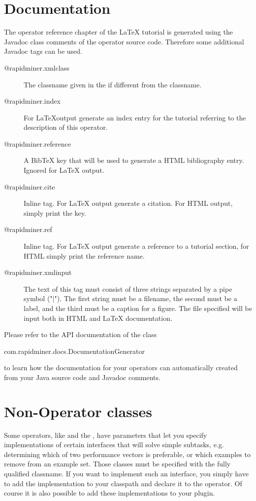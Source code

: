 \section{Documentation}
The operator reference chapter of the  \LaTeX{} \rapidminer tutorial is
generated using the Javadoc class comments of the operator source
code. Therefore some additional Javadoc tags can be used. 
\begin{description}
\item[@rapidminer.xmlclass] The classname given in the
   if different from the classname.
\item[@rapidminer.index] For \LaTeX output generate an index entry for the
  tutorial referring to the description of this operator.
\item[@rapidminer.reference] A BibTeX key that will be used to generate a
  HTML bibliography entry. Ignored for \LaTeX{} output.
\item[@rapidminer.cite] Inline tag. For \LaTeX{} output generate a citation. For HTML
  output, simply print the key.
\item[@rapidminer.ref] Inline tag. For \LaTeX{} output generate a reference
  to a tutorial section, for HTML simply print the reference name.
\item[@rapidminer.xmlinput] The text of this tag must consist of three
  strings separated by a pipe symbol ("$|$"). The first string must be
  a filename, the second must be a label, and the third must be a
  caption for a figure. The file specified will be input both in HTML
  and \LaTeX{} documentation.
\end{description}
Please refer to the API documentation of the class
\begin{center}
com.rapidminer.docs.DocumentationGenerator
\end{center}
to learn how the documentation for your operators can automatically created
from your Java source code and Javadoc comments.
 


\section{Non-Operator classes}

Some operators, like  and the
, have parameters that let you specify
implementations of certain interfaces that will solve simple
subtasks, e.g. determining which of two performance vectors is
preferable, or which examples to remove from an example set. Those classes
must be specified with the fully qualified classname. If you want to implement
such an interface, you simply have to add the implementation to your classpath
and declare it to the operator. Of course it is also possible to add these
implementations to your plugin.



